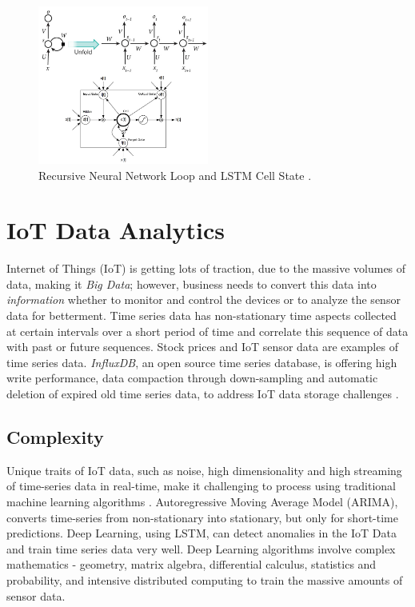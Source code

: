 \documentclass[sigconf]{acmart}
\begin{document}
	\begin{figure}
		\centering
		\includegraphics[width=0.5\textwidth]{images/rnn}
		\caption{Recursive Neural Network Loop and LSTM Cell State \cite{LeCun2015, Leonard2016}.} \label{fig:figure4} 
	\end{figure}

	
	\section{IoT Data Analytics}
	
	Internet of Things (IoT) is getting lots of traction, due to the massive volumes of data, making it {\em Big Data}; however, business needs to convert this data into {\em information} whether to monitor and control the devices or to analyze the sensor data for betterment. Time series data has non-stationary time aspects collected at certain intervals over a short period of time and correlate this sequence of data with past or future sequences. Stock prices and IoT sensor data are examples of time series data. {\em InfluxDB}, an open source time series database, is offering high write performance, data compaction through down-sampling and automatic deletion of expired old time series data, to address IoT data storage challenges \cite{Influx}.	
	
	
	\subsection{Complexity}
	
	Unique traits of IoT data, such as noise, high dimensionality and high streaming of time-series data in real-time, make it challenging to process using traditional machine learning algorithms \cite{Sampathkumar2016}. Autoregressive Moving Average Model (ARIMA), converts time-series from non-stationary into stationary, but only for short-time predictions. Deep Learning, using LSTM, can detect anomalies in the IoT Data and train time series data very well. Deep Learning algorithms involve complex mathematics - geometry, matrix algebra, differential calculus, statistics and probability, and intensive distributed computing to train the massive amounts of sensor data.
	
\end{document}
